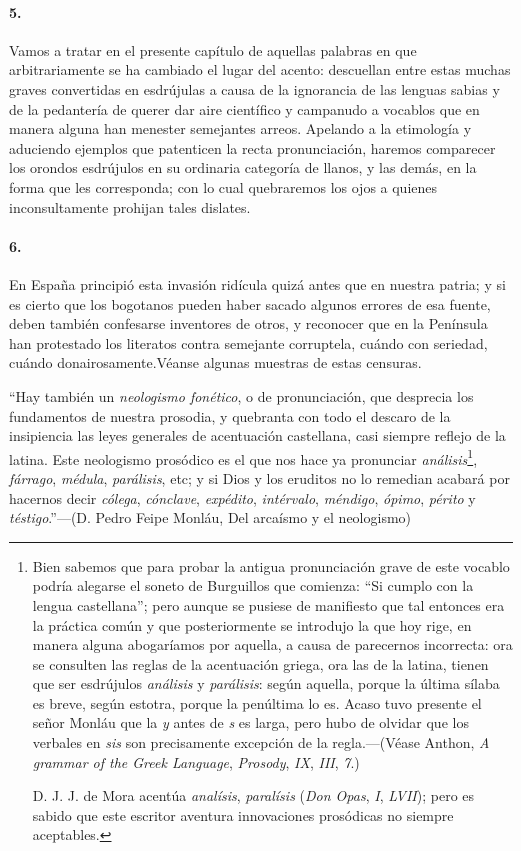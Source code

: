 \documentclass{book}
\begin{document}
\paragraph{5.} Vamos a tratar en el presente capítulo de aquellas palabras en que arbitrariamente se ha 
cambiado el lugar del acento: descuellan entre estas muchas graves convertidas en esdrújulas a causa de 
la ignorancia de las lenguas sabias y de la pedantería de querer dar aire científico y campanudo a 
vocablos que en manera alguna han menester semejantes arreos. Apelando a la etimología y aduciendo 
ejemplos que patenticen la recta pronunciación, haremos comparecer los orondos esdrújulos en su ordinaria 
categoría de llanos, y las demás, en la forma que les corresponda; con lo cual quebraremos los ojos a 
quienes inconsultamente prohijan tales dislates.

\paragraph{6.} En España principió esta invasión ridícula quizá antes que en nuestra patria; y si es 
cierto que los bogotanos pueden haber sacado algunos errores de esa fuente, deben también confesarse 
inventores de otros, y reconocer que en la Península han protestado los literatos contra semejante 
corruptela, cuándo con seriedad, cuándo donairosamente.Véanse algunas muestras de estas censuras.

``Hay también un \emph{neologismo fonético}, o de pronunciación, que desprecia los fundamentos de nuestra 
prosodia, y quebranta con todo el descaro de la insipiencia las leyes generales de acentuación 
castellana, casi siempre reflejo de la latina. Este neologismo prosódico es el que nos hace ya pronunciar 
\emph{análisis}\footnote{Bien sabemos que para probar la antigua pronunciación grave de este vocablo 
podría alegarse el soneto de Burguillos que comienza: ``Si cumplo con la lengua castellana''; pero aunque 
se pusiese de manifiesto que tal entonces era la práctica común y que posteriormente se introdujo la que 
hoy rige, en manera alguna abogaríamos por aquella, a causa de parecernos incorrecta: ora se consulten 
las reglas de la acentuación griega, ora las de la latina, tienen que ser esdrújulos \emph{análisis} y 
\emph{parálisis}: según aquella, porque la última sílaba es breve, según estotra, porque la penúltima lo 
es. Acaso tuvo presente el señor Monláu que la \emph{y} antes de \emph{s} es larga, pero hubo de olvidar 
que los verbales en \emph{sis} son precisamente excepción de la regla.---(Véase Anthon, \emph{A grammar 
of the Greek Language}, \emph{Prosody}, \emph{IX}, \emph{III}, \emph{7}.)

D. J. J. de Mora acentúa \emph{analísis}, \emph{paralísis} (\emph{Don Opas}, \emph{I}, \emph{LVII}); pero 
es sabido que este escritor aventura innovaciones prosódicas no siempre aceptables.}, \emph{fárrago}, 
\emph{médula}, \emph{parálisis}, etc; y si Dios y los eruditos no lo remedian acabará por hacernos decir 
\emph{cólega}, \emph{cónclave}, \emph{expédito}, \emph{intérvalo}, \emph{méndigo}, \emph{ópimo}, 
\emph{périto} y \emph{téstigo}.''---(D. Pedro Feipe Monláu, Del arcaísmo y el neologismo)
\end{document}
